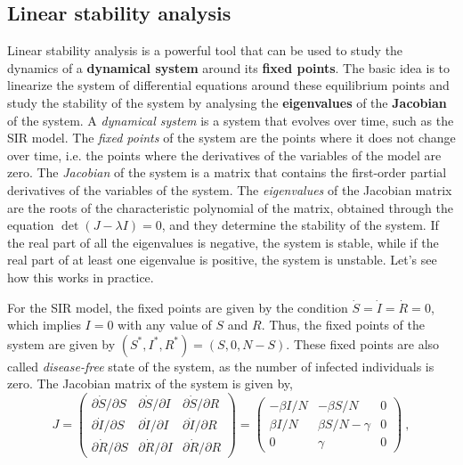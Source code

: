 \subsection{Linear stability analysis}

Linear stability analysis is a powerful tool that can be used to study the
dynamics of a \textbf{dynamical system} around its \textbf{fixed points}. The
basic idea is to linearize the system of differential equations around these
equilibrium points and study the stability of the system by analysing the
\textbf{eigenvalues} of the \textbf{Jacobian} of the system. A
\textit{dynamical system} is a system that evolves over time,
such as the SIR model. The \textit{fixed points} of the system are the points
where it does not change over time, i.e. the points where the derivatives of
the variables of the model are zero. The \textit{Jacobian} of the system is a
matrix that contains the first-order partial derivatives of the variables of
the system. The \textit{eigenvalues} of the Jacobian matrix are the roots of
the characteristic polynomial of the matrix, obtained through the equation
$\det(J-\lambda I)=0 $, and they determine the stability of the system. If the
real part of all the eigenvalues is negative, the system is stable, while if
the real part of at least one eigenvalue is positive, the system is unstable.
Let's see how this works in practice.

For the SIR model, the fixed points are given by the condition
$\dot{S}=\dot{I}=\dot{R}=0$, which implies $I=0$ with any value of $S$ and $R$.
Thus, the fixed points of the system are given by $(S^*,I^*,R^*)=(S,0,N-S)$.
These fixed points are also called \textit{disease-free} state of the system,
as the number of infected individuals is zero. The Jacobian matrix of the
system is given by,
\begin{equation}
  J=\begin{pmatrix}
    \partial\dot{S}/\partial S & \partial\dot{S}/\partial I &
    \partial\dot{S}/\partial R                                \\
    \partial\dot{I}/\partial S & \partial\dot{I}/\partial I &
    \partial\dot{I}/\partial R                                \\
    \partial\dot{R}/\partial S & \partial\dot{R}/\partial I &
    \partial\dot{R}/\partial R
  \end{pmatrix}=\begin{pmatrix}
    -\beta I/N & -\beta S/N       & 0 \\
    \beta I/N  & \beta S/N-\gamma & 0 \\
    0          & \gamma           & 0
  \end{pmatrix} \ ,
\end{equation}

